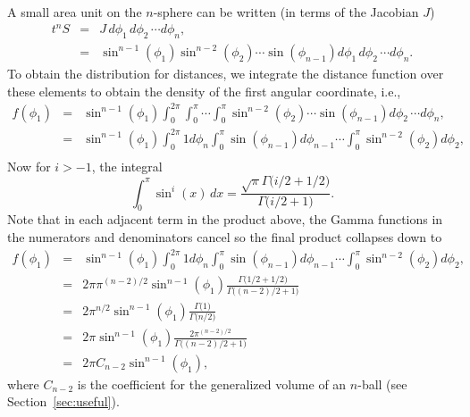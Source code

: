 A small area unit on the $n$-sphere can be written (in terms of the
Jacobian $J$)
\begin{eqnarray}
  \label{eq:vn_n_sphere}
  t^nS & = & J \, d\phi_1 \, d\phi_2 \, \cdots d\phi_{n},  \nonumber \\
       & = & \sin^{n-1}(\phi_1) \sin^{n-2}(\phi_2) \cdots \sin(\phi_{n-1})
                  d\phi_1 \, d\phi_2 \, \cdots d\phi_{n}.
\end{eqnarray}
To obtain the distribution for distances, we integrate the distance
function over these elements to obtain the density of the first
angular coordinate, i.e.,
\begin{eqnarray}
  f(\phi_1)
      & = & \sin^{n-1}(\phi_1)
              \int_{0}^{2\pi} \int_{0}^{\pi} \cdots  \int_{0}^{\pi} 
              \sin^{n-2}(\phi_2) \cdots \sin(\phi_{n-1})
                   d\phi_2 \, \cdots d\phi_{n}, \nonumber \\
      & = & \sin^{n-1}(\phi_1)
              \int_{0}^{2\pi} 1 d\phi_{n} 
              \int_{0}^{\pi} \sin(\phi_{n-1}) d\phi_{n-1}  
              \cdots  
              \int_{0}^{\pi} \sin^{n-2}(\phi_2)  d\phi_{2}, \nonumber \\   
\end{eqnarray}
Now for $i>-1$, the integral %
\begin{equation}
  \label{eq:int_sin_n}
  \int_0^{\pi} \sin^i(x) \, dx = 
       \frac{\sqrt{\pi} \Gamma\big( i/2 + 1/2 \big)}{\Gamma\big( i/2+1 \big)}.
\end{equation}
Note that in each adjacent term in the product above, the Gamma
functions in the numerators and denominators cancel so the final
product collapses down to
\begin{eqnarray}
  f(\phi_1)
      & = & \sin^{n-1}(\phi_1)
              \int_{0}^{2\pi} 1 d\phi_{n} 
              \int_{0}^{\pi} \sin(\phi_{n-1}) d\phi_{n-1}  
              \cdots  
              \int_{0}^{\pi} \sin^{n-2}(\phi_2)  d\phi_{2}, \nonumber \\   
      & = & 2 \pi \pi^{(n-2)/2} \sin^{n-1}(\phi_1)  
                     \frac{\Gamma\big( 1/2 + 1/2 \big)}{\Gamma\big( (n-2)/2+1 \big)}
                 \nonumber \\   
      & = & 2 \pi^{n/2} \sin^{n-1}(\phi_1)  
                     \frac{\Gamma\big(1 \big)}{\Gamma\big( n/2 \big)}
                 \nonumber \\   
      & = &  2 \pi \sin^{n-1}(\phi_1)  
                     \frac{2 \pi^{(n-2)/2}}{\Gamma\big( (n-2)/2+1 \big)}
                 \nonumber \\   
      & = &   2 \pi C_{n-2} \sin^{n-1}(\phi_1),
\end{eqnarray}
where $C_{n-2}$ is the coefficient for the generalized volume of an
$n$-ball (see Section~\ref{sec:useful}).

